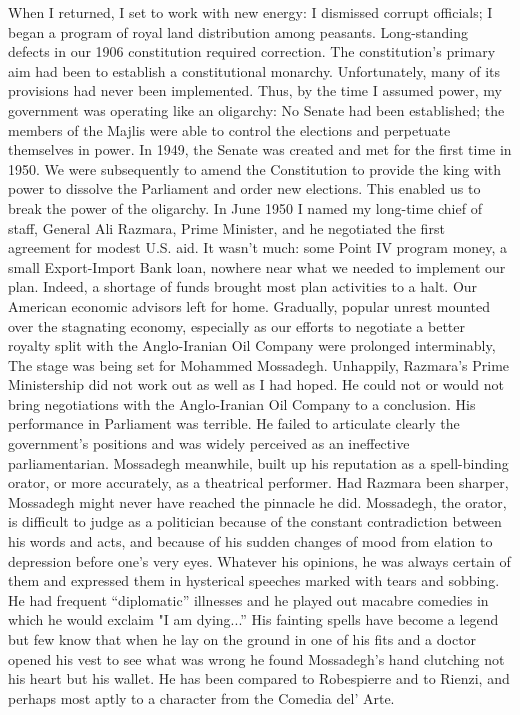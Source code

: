 When I returned, I set to work with new energy: I dismissed corrupt officials; I began a program of royal land distribution among peasants. Long-standing defects in our 1906 constitution required correction. The constitution's primary aim had been to establish a constitutional monarchy. Unfortunately, many of its provisions had never been implemented. Thus, by the time I assumed power, my government was operating like an oligarchy: No Senate had been established; the members of the Majlis were able to control the elections and perpetuate themselves in power. In 1949, the Senate was created and met for the first time in 1950. We were subsequently to amend the Constitution to provide the king with power to dissolve the Parliament and order new elections. This enabled us to break the power of the oligarchy. In June 1950 I named my long-time chief of staff, General Ali Razmara, Prime Minister, and he negotiated the first agreement for modest U.S. aid. It wasn't much: some Point IV program money, a small Export-Import Bank loan, nowhere near what we needed to implement our plan. Indeed, a shortage of funds brought most plan activities to a halt. Our American economic advisors left for home. Gradually, popular unrest mounted over the stagnating economy, especially as our efforts to negotiate a better royalty split with the Anglo-Iranian Oil Company were prolonged interminably, The stage was being set for Mohammed Mossadegh. Unhappily, Razmara’s Prime Ministership did not work out as well as I had hoped. He could not or would not bring negotiations with the Anglo-Iranian Oil Company to a conclusion. His performance in Parliament was terrible. He failed to articulate clearly the government's positions and was widely perceived as an ineffective parliamentarian. Mossadegh meanwhile, built up his reputation as a spell-binding orator, or more accurately, as a theatrical performer. Had Razmara been sharper, Mossadegh might never have reached the pinnacle he did. Mossadegh, the orator, is difficult to judge as a politician because of the constant contradiction between his words and acts, and because of his sudden changes of mood from elation to depression before one's very eyes. Whatever his opinions, he was always certain of them and expressed them in hysterical speeches marked with tears and sobbing. He had frequent “diplomatic” illnesses and he played out macabre comedies in which he would exclaim "I am dying...” His fainting spells have become a legend but few know that when he lay on the ground in one of his fits and a doctor opened his vest to see what was wrong he found Mossadegh’s hand clutching not his heart but his wallet. He has been compared to Robespierre and to Rienzi, and perhaps most aptly to a character from the Comedia del’ Arte. 

